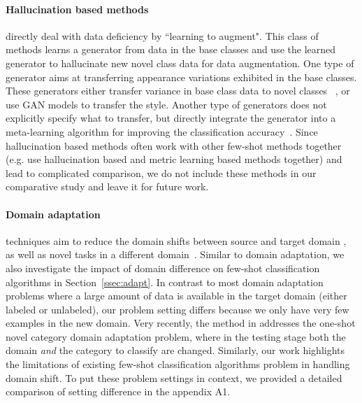 \documentclass{article}
\newlength\paramargin
\newcommand{\ssecref}[1]{Section~\ref{ssec:#1}}
\begin{document}
\paragraph{Hallucination based methods} directly deal with data deficiency by ``learning to augment". This class of methods learns a generator from data in the base classes and use the learned generator to hallucinate new novel class data for data augmentation.
One type of generator aims at transferring appearance variations exhibited in the base classes. These generators either transfer variance in base class data to novel classes ~\cite{hariharan2017low}, or use GAN models \cite{antoniou2018data} to transfer the style. Another type of generators does not explicitly specify what to transfer, but directly integrate the generator into a meta-learning algorithm for improving the classification accuracy~\cite{wang2018low}.
Since hallucination based methods often work with other few-shot methods together (e.g. use hallucination based and metric learning based methods together) and lead to complicated comparison, we do not include these methods in our comparative study and leave it for future work.


















\vspace{\paramargin}
\paragraph{Domain adaptation} techniques aim to reduce the domain shifts between source and target domain \cite{pan2010survey,ganin2015unsupervised}, as well as novel tasks in a different domain~\cite{hsu2017learning}. Similar to domain adaptation, we also investigate the impact of domain difference on few-shot classification algorithms in \ssecref{adapt}. In contrast to most domain adaptation problems where a large amount of data is available in the target domain (either labeled or unlabeled), our problem setting differs because we only have very few examples in the new domain. Very recently, the method in \cite{dong2018domain} addresses the one-shot novel category domain adaptation problem, where in the testing stage both the domain \emph{and} the category to classify are changed. Similarly, our work highlights the limitations of existing few-shot classification algorithms problem in handling domain shift. To put these problem settings in context, we provided a detailed comparison of setting difference in the appendix A1.
\end{document}
